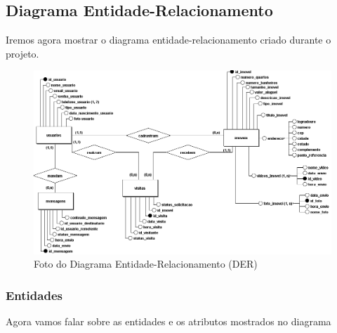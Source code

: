 \subsection{Diagrama Entidade-Relacionamento}

Iremos agora mostrar o diagrama entidade-relacionamento criado durante o projeto.

\begin{figure}[h!] 
    \centering
    \includegraphics[width=\textwidth]{./img/Conceitual.png}
    
    \caption{Foto do Diagrama Entidade-Relacionamento (DER)}
    \label{fig:exemplo-imagem}
\end{figure}

\subsubsection{Entidades}
Agora vamos falar sobre as entidades e os atributos mostrados no diagrama\\


\setlength{\extrarowheight}{5pt} 

